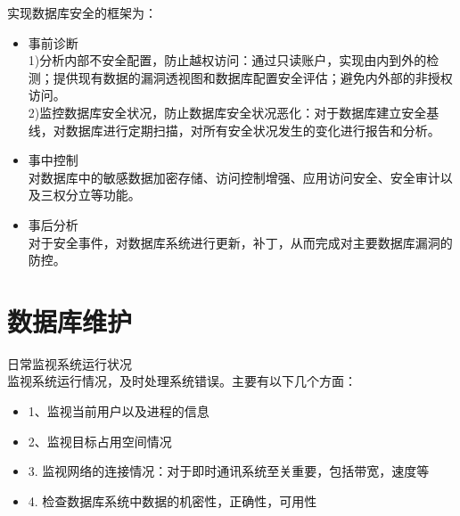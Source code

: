 实现数据库安全的框架为：
\begin{itemize}
    \item 事前诊断\\
    1)分析内部不安全配置，防止越权访问：通过只读账户，实现由内到外的检测；提供现有数据的漏洞透视图和数据库配置安全评估；避免内外部的非授权访问。\\
    2)监控数据库安全状况，防止数据库安全状况恶化：对于数据库建立安全基线，对数据库进行定期扫描，对所有安全状况发生的变化进行报告和分析。
    \item 事中控制 \\
    对数据库中的敏感数据加密存储、访问控制增强、应用访问安全、安全审计以及三权分立等功能。
    \item 事后分析 \\
    对于安全事件，对数据库系统进行更新，补丁，从而完成对主要数据库漏洞的防控。
    
\end{itemize}


\section{数据库维护}

日常监视系统运行状况\\

监视系统运行情况，及时处理系统错误。主要有以下几个方面：
\begin{itemize}
    

\item 1、监视当前用户以及进程的信息
\item 2、监视目标占用空间情况
\item 3. 监视网络的连接情况：对于即时通讯系统至关重要，包括带宽，速度等
\item 4. 检查数据库系统中数据的机密性，正确性，可用性

\end{itemize}

